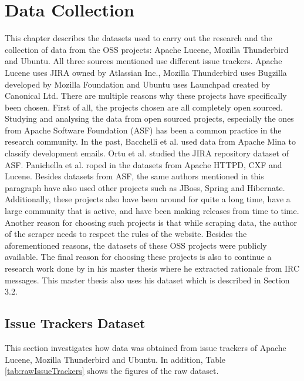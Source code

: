 \documentclass[a4paper,12pt,twoside]{report}
\begin{document}

\chapter{Data Collection}

This chapter describes the datasets used to carry out the research and the collection of data from the OSS projects: Apache Lucene, Mozilla Thunderbird and Ubuntu. All three sources mentioned use different issue trackers. Apache Lucene uses JIRA owned by Atlassian Inc., Mozilla Thunderbird uses Bugzilla developed by Mozilla Foundation and Ubuntu uses Launchpad created by Canonical Ltd. 
\newline \newline
There are multiple reasons why these projects have specifically been chosen. First of all, the projects chosen are all completely open sourced. Studying and analysing the data from open sourced projects, especially the ones from Apache Software Foundation (ASF) has been a common practice in the research community. In the past, Bacchelli et al.\cite{Bacchelli2012} used data from Apache Mina to classify development emails. Ortu et al.\cite{Ortu2015} studied the JIRA repository dataset of ASF. Panichella et al. \cite{Panichella2014} roped in the datasets from Apache HTTPD, CXF and Lucene. Besides datasets from ASF, the same authors mentioned in this paragraph have also used other projects such as JBoss, Spring and Hibernate. Additionally, these projects also have been around for quite a long time, have a large community that is active, and have been making releases from time to time. Another reason for choosing such projects is that while scraping data, the author of the scraper needs to respect the rules of the website. Besides the aforementioned reasons, the datasets of these OSS projects were publicly available. The final reason for choosing these projects is also to continue a research work done by \cite{Nonnenmacher2017} in his master thesis where he extracted rationale from IRC messages. This master thesis also uses his dataset which is described in Section 3.2. 

\section{Issue Trackers Dataset}
This section investigates how data was obtained from issue trackers of Apache Lucene, Mozilla Thunderbird and Ubuntu. In addition, Table \ref{tab:rawIssueTrackers} shows the figures of the raw dataset. 
\end{document}
